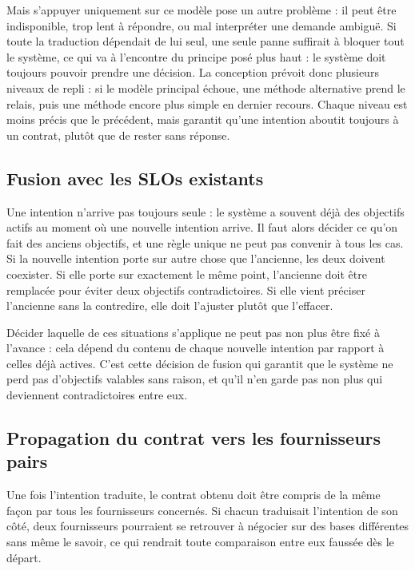 Mais s'appuyer uniquement sur ce modèle pose un autre problème : il peut être indisponible, trop lent à répondre, ou mal interpréter une demande ambiguë. Si toute la traduction dépendait de lui seul, une seule panne suffirait à bloquer tout le système, ce qui va à l'encontre du principe posé plus haut : le système doit toujours pouvoir prendre une décision. La conception prévoit donc plusieurs niveaux de repli : si le modèle principal échoue, une méthode alternative prend le relais, puis une méthode encore plus simple en dernier recours. Chaque niveau est moins précis que le précédent, mais garantit qu'une intention aboutit toujours à un contrat, plutôt que de rester sans réponse.

\subsection{Fusion avec les SLOs existants}

Une intention n'arrive pas toujours seule : le système a souvent déjà des objectifs actifs au moment où une nouvelle intention arrive. Il faut alors décider ce qu'on fait des anciens objectifs, et une règle unique ne peut pas convenir à tous les cas. Si la nouvelle intention porte sur autre chose que l'ancienne, les deux doivent coexister. Si elle porte sur exactement le même point, l'ancienne doit être remplacée pour éviter deux objectifs contradictoires. Si elle vient préciser l'ancienne sans la contredire, elle doit l'ajuster plutôt que l'effacer.

Décider laquelle de ces situations s'applique ne peut pas non plus être fixé à l'avance : cela dépend du contenu de chaque nouvelle intention par rapport à celles déjà actives. C'est cette décision de fusion qui garantit que le système ne perd pas d'objectifs valables sans raison, et qu'il n'en garde pas non plus qui deviennent contradictoires entre eux.

\subsection{Propagation du contrat vers les fournisseurs pairs}

Une fois l'intention traduite, le contrat obtenu doit être compris de la même façon par tous les fournisseurs concernés. Si chacun traduisait l'intention de son côté, deux fournisseurs pourraient se retrouver à négocier sur des bases différentes sans même le savoir, ce qui rendrait toute comparaison entre eux faussée dès le départ.

